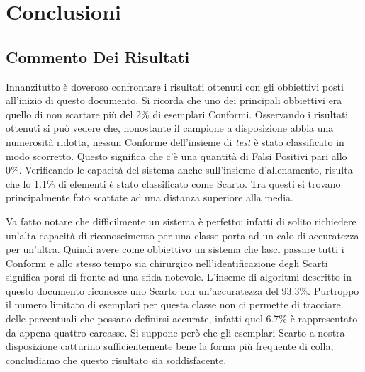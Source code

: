 
\chapter{Conclusioni}

\section{Commento Dei Risultati}
Innanzitutto è doveroso confrontare i risultati ottenuti con gli obbiettivi posti all'inizio di questo documento.
Si ricorda che uno dei principali obbiettivi era quello di non scartare più del 2\% di esemplari Conformi.
Osservando i risultati ottenuti si può vedere che, nonostante il campione a disposizione abbia una numerosità ridotta, nessun Conforme dell'insieme di \textit{test} è stato classificato in modo scorretto.
Questo significa che c'è una quantità di Falsi Positivi pari allo 0\%.
Verificando le capacità del sistema anche sull'insieme d'allenamento, risulta che lo 1.1\% di elementi è stato classificato come Scarto.
Tra questi si trovano principalmente foto scattate ad una distanza superiore alla media.

Va fatto notare che difficilmente un sistema è perfetto: infatti di solito richiedere un'alta capacità di riconoscimento per una classe porta ad un calo di accuratezza per un'altra.
Quindi avere come obbiettivo un sistema che lasci passare tutti i Conformi e allo stesso tempo sia chirurgico nell'identificazione degli Scarti significa porsi di fronte ad una sfida notevole.
L'inseme di algoritmi descritto in questo documento riconosce uno Scarto con un'accuratezza del 93.3\%.
Purtroppo il numero limitato di esemplari per questa classe non ci permette di tracciare delle percentuali che possano definirsi accurate, infatti quel 6.7\% è rappresentato da appena quattro carcasse.
Si suppone però che gli esemplari Scarto a nostra disposizione catturino sufficientemente bene la forma più frequente di colla, concludiamo che questo risultato sia soddisfacente.

